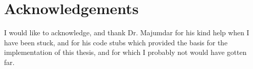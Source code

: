 \chapter{Acknowledgements}

I would like to acknowledge, and thank Dr. Majumdar for his kind help when I
have been stuck, and for his code stubs which provided the basis for the
implementation of this thesis, and for which I probably not would have gotten far.
